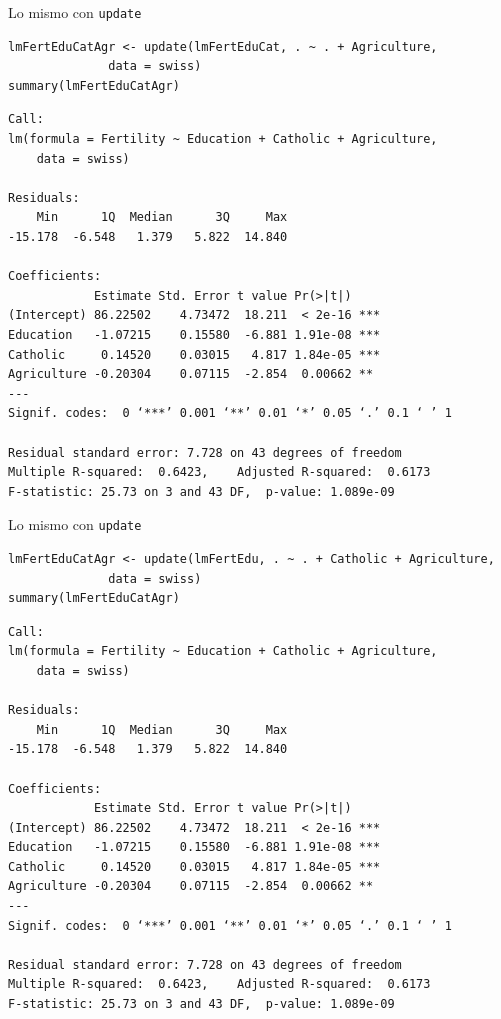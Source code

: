 \documentclass[xcolor={usenames,svgnames,dvipsnames}]{beamer}
\begin{document}
\begin{frame}[fragile,label=sec-3-6]{Lo mismo con \texttt{update}}
 \lstset{language=R,numbers=none}
\begin{lstlisting}
lmFertEduCatAgr <- update(lmFertEduCat, . ~ . + Agriculture,
			  data = swiss)
summary(lmFertEduCatAgr)
\end{lstlisting}

\begin{verbatim}
Call:
lm(formula = Fertility ~ Education + Catholic + Agriculture, 
    data = swiss)

Residuals:
    Min      1Q  Median      3Q     Max 
-15.178  -6.548   1.379   5.822  14.840 

Coefficients:
            Estimate Std. Error t value Pr(>|t|)    
(Intercept) 86.22502    4.73472  18.211  < 2e-16 ***
Education   -1.07215    0.15580  -6.881 1.91e-08 ***
Catholic     0.14520    0.03015   4.817 1.84e-05 ***
Agriculture -0.20304    0.07115  -2.854  0.00662 ** 
---
Signif. codes:  0 ‘***’ 0.001 ‘**’ 0.01 ‘*’ 0.05 ‘.’ 0.1 ‘ ’ 1

Residual standard error: 7.728 on 43 degrees of freedom
Multiple R-squared:  0.6423,	Adjusted R-squared:  0.6173 
F-statistic: 25.73 on 3 and 43 DF,  p-value: 1.089e-09
\end{verbatim}
\end{frame}
\begin{frame}[fragile,label=sec-3-7]{Lo mismo con \texttt{update}}
 \lstset{language=R,numbers=none}
\begin{lstlisting}
lmFertEduCatAgr <- update(lmFertEdu, . ~ . + Catholic + Agriculture,
			  data = swiss)
summary(lmFertEduCatAgr)
\end{lstlisting}

\begin{verbatim}
Call:
lm(formula = Fertility ~ Education + Catholic + Agriculture, 
    data = swiss)

Residuals:
    Min      1Q  Median      3Q     Max 
-15.178  -6.548   1.379   5.822  14.840 

Coefficients:
            Estimate Std. Error t value Pr(>|t|)    
(Intercept) 86.22502    4.73472  18.211  < 2e-16 ***
Education   -1.07215    0.15580  -6.881 1.91e-08 ***
Catholic     0.14520    0.03015   4.817 1.84e-05 ***
Agriculture -0.20304    0.07115  -2.854  0.00662 ** 
---
Signif. codes:  0 ‘***’ 0.001 ‘**’ 0.01 ‘*’ 0.05 ‘.’ 0.1 ‘ ’ 1

Residual standard error: 7.728 on 43 degrees of freedom
Multiple R-squared:  0.6423,	Adjusted R-squared:  0.6173 
F-statistic: 25.73 on 3 and 43 DF,  p-value: 1.089e-09
\end{verbatim}
\end{frame}
\end{document}
